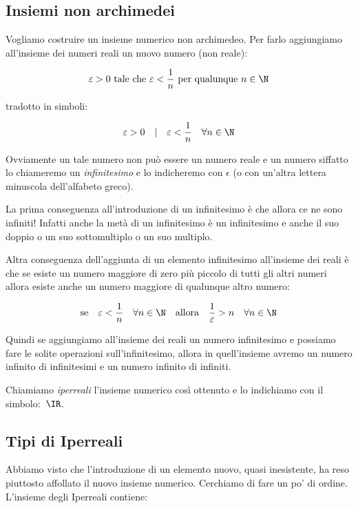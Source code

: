 \subsection{Insiemi non archimedei}
\label{subsec:insnum_nonarchimedei}

Vogliamo costruire un insieme numerico non archimedeo. Per farlo aggiungiamo 
all'insieme dei numeri reali un nuovo numero (non reale):

\[\varepsilon > 0 \text{ tale che } 
\varepsilon < \frac{1}{n} \text{ per qualunque } n \in \N\]

tradotto in simboli:

\[\varepsilon > 0 \quad | \quad \varepsilon < \frac{1}{n} \quad \forall n \in 
\N\]

Ovviamente un tale numero non può essere un numero reale e un numero siffatto 
lo chiameremo un \emph{infinitesimo} e lo indicheremo con $\epsilon$ 
(o con un'altra lettera minuscola dell'alfabeto greco).

La prima conseguenza all'introduzione di un infinitesimo è che allora ce ne 
sono infiniti! Infatti anche la metà di un infinitesimo è un infinitesimo e 
anche il suo doppio o un suo sottomultiplo o un suo multiplo.

Altra conseguenza dell'aggiunta di un elemento infinitesimo all'insieme dei 
reali è che se esiste un numero maggiore di zero più piccolo di tutti gli altri 
numeri allora esiste anche un numero maggiore di qualunque altro numero:

\[\text{se} \quad \varepsilon < \frac{1}{n} \quad \forall n \in \N 
\quad \text{allora} \quad \frac{1}{\varepsilon} > n \quad \forall n 
\in \N\]

Quindi se aggiungiamo all'insieme dei reali un numero infinitesimo e possiamo 
fare le solite operazioni sull'infinitesimo, allora in quell'insieme avremo un 
numero infinito di infinitesimi e un numero infinito di infiniti.

Chiamiamo \emph{iperreali} l'insieme numerico così ottenuto e lo indichiamo con 
il simbolo:~$\IR$.

\subsection{Tipi di Iperreali}
\label{subsec:insnum_nonarchimedei}

Abbiamo visto che l'introduzione di un elemento nuovo, quasi inesistente, ha 
reso piuttosto affollato il nuovo insieme numerico. Cerchiamo di fare un po' 
di ordine. L'insieme degli Iperreali contiene:

